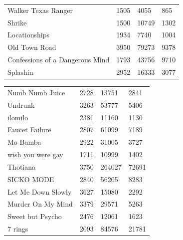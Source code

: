 \documentclass[12pt,conference]{IEEEtran}
\begin{document}
\begin{center}
\begin{small}
{\begin{tabular}{l|l|l|l}
Walker Texas Ranger             & 1505   & 4055      & 865      \\
Shrike                          & 1500   & 10749     & 1302     \\
Locationships                   & 1934   & 7740      & 1004     \\
Old Town Road                   & 3950   & 79273     & 9378     \\
Confessions of a Dangerous Mind & 1793   & 43756     & 9710     \\
Splashin                        & 2952   & 16333     & 3077     
\end{tabular}}
\end{small}
\end{center}

\begin{center}
\begin{small}
{\begin{tabular}{l|l|l|l}
\centering
Numb Numb Juice                 & 2728   & 13751     & 2841     \\
Undrunk                         & 3263   & 53777     & 5406     \\
ilomilo                         & 2381   & 11160     & 1130     \\
Faucet Failure                  & 2807   & 61099     & 7189     \\
Mo Bamba                        & 2922   & 31005     & 3727     \\
wish you were gay               & 1711   & 10999     & 1402     \\
Thotiana                        & 3750   & 264027    & 72691    \\
SICKO MODE                      & 2840   & 56205     & 8283     \\
Let Me Down Slowly              & 3627   & 15080     & 2292     \\
Murder On My Mind               & 3379   & 29571     & 5263     \\
Sweet but Psycho                & 2476   & 12061     & 1623     \\
7 rings                         & 2093   & 84576     & 21781   
\end{tabular}}
\end{small}
\end{center}
\end{document}
